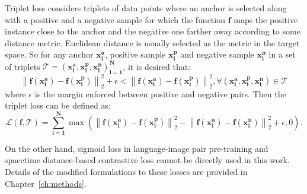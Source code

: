 Triplet loss considers triplets of data points where an anchor is selected along with a positive and a negative sample for which the function $\mathbf{f}$ maps the positive instance close to the anchor and the negative one farther away according to some distance metric. Euclidean distance is usually selected as the metric in the target space. So for any anchor $\mathbf{x^a_i}$, positive sample $\mathbf{x^p_i}$ and negative sample $\mathbf{x^n_i}$ in a set of triplets $\mathcal{T} = \mathbf{\left(x_{i}^{a}, x_{i}^{p}, x_{i}^{n}\right)_{i=1}^N}$, it is desired that:
\begin{equation}\label{tripletcondition}
    \left\|\mathbf{f(x_{i}^{a})-f(x_{i}^{p})}\right\|_{2}^{2}+\epsilon<\left\|\mathbf{f(x_{i}^{a})-f(x_{i}^{p})}\right\|_{2}^{2}, \forall\left(\mathbf{x_{i}^{a}, x_{i}^{p}, x_{i}^{n}}\right) \in \mathcal{T} 
\end{equation}
where $\epsilon$ is the margin enforced between positive and negative pairs. Then the triplet loss can be defined as:
\begin{equation}\label{tripletloss}
    \mathcal{L}(\mathbf{f}, \mathcal{T}) = \sum_{\mathbf{i=1}}^\mathbf{N} \max \left(\left\|\mathbf{f(x_{i}^{a})-f(x_{i}^{p})}\right\|_{2}^{2} - \left\|\mathbf{f(x_{i}^{a})-f(x_{i}^{n})}\right\|_{2}^{2} +\epsilon, 0\right) .
\end{equation}
\newline

On the other hand, sigmoid loss in language-image pair pre-training and spacetime distance-based contrastive loss cannot be directly used in this work. Details of the modified formulations to these losses are provided in Chapter~\ref{ch:methods}.